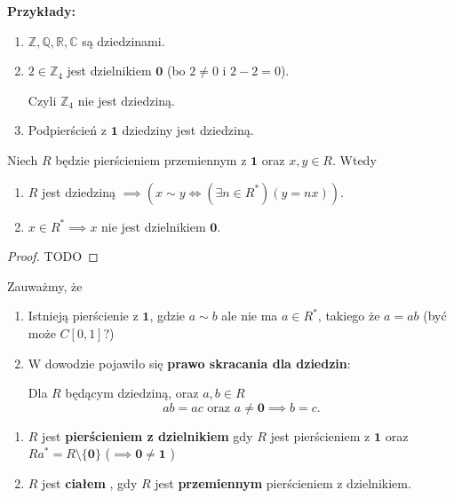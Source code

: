 \noindent \textbf{Przykłady:}
\begin{enumerate}[label=\arabic*)]
	\item $\mathbb{Z}, \mathbb{Q} , \mathbb{R} , \mathbb{C} $ są dziedzinami.
	\item $2\in \mathbb{Z} _{4}$ jest dzielnikiem $\mathbf{0}$ (bo $2\neq 0$ i $2-2=0$).

		Czyli $\mathbb{Z}_{4}$ nie jest dziedziną. 
	\item Podpierścień z $\mathbf{1}$ dziedziny jest dziedziną.
\end{enumerate}
\begin{fact}
	Niech $R$ będzie pierścieniem przemiennym z $\mathbf{1}$ oraz $x,y \in R$. Wtedy
	\begin{enumerate}[label=\arabic*)]
		\item $R$ jest dziedziną $\implies \left( x\sim y \iff \left(\exists n \in R^{\ast}  \right)\left( y = nx \right)   \right) $.
		\item $x\in R^{\ast} \implies x$ nie jest dzielnikiem $\mathbf{0}$.
	\end{enumerate}
\end{fact}
\begin{proof}
	TODO
\end{proof} 
\begin{remark}
	Zauważmy, że
	\begin{enumerate}[label=\arabic*)]
		\item Istnieją pierścienie z $\mathbf{1}$, gdzie $a\sim b$ ale nie ma $a\in R^{\ast} $, takiego że $a=ab$ (być może  $C\left[ 0,1 \right] $?)
		\item W dowodzie pojawiło się \textbf{prawo skracania dla dziedzin}:

			Dla $R$ będącym dziedziną, oraz $a,b \in R$ 
			\[
			ab = ac\text{ oraz }a\neq \mathbf{0}\implies b = c
			.\] 
	\end{enumerate}
\end{remark} 
\begin{definition}
	\begin{enumerate}[label=\arabic*)]
		\item $R$ jest \textbf{pierścieniem z dzielnikiem} gdy $R$ jest pierścieniem z $\mathbf{1}$ oraz $Ra^{\ast} = R\setminus \{\mathbf{0}\} $ ($\implies \mathbf{0}\neq \mathbf{1}$ )
		\item $R$ jest \textbf{ciałem }, gdy $R$ jest \textbf{przemiennym} pierścieniem z dzielnikiem.
	\end{enumerate}
\end{definition} 
